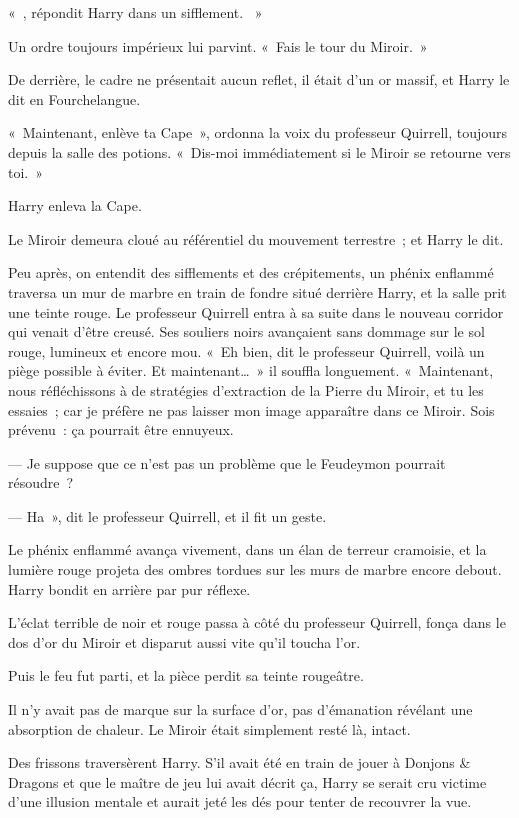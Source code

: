 «~, répondit Harry dans un sifflement. ~»

Un ordre toujours impérieux lui parvint. «~Fais le tour du Miroir.~»

De derrière, le cadre ne présentait aucun reflet, il était d'un or massif, et Harry le dit en Fourchelangue.

«~Maintenant, enlève ta Cape~», ordonna la voix du professeur Quirrell, toujours depuis la salle des potions. «~Dis-moi immédiatement si le Miroir se retourne vers toi.~»

Harry enleva la Cape.

Le Miroir demeura cloué au référentiel du mouvement terrestre~; et Harry le dit.

Peu après, on entendit des sifflements et des crépitements, un phénix enflammé traversa un mur de marbre en train de fondre situé derrière Harry, et la salle prit une teinte rouge. Le professeur Quirrell entra à sa suite dans le nouveau corridor qui venait d'être creusé. Ses souliers noirs avançaient sans dommage sur le sol rouge, lumineux et encore mou. «~Eh bien, dit le professeur Quirrell, voilà un piège possible à éviter. Et maintenant…~» il souffla longuement. «~Maintenant, nous réfléchissons à de stratégies d'extraction de la Pierre du Miroir, et tu les essaies~; car je préfère ne pas laisser mon image apparaître dans ce Miroir. Sois prévenu~: ça pourrait être ennuyeux.

--- Je suppose que ce n'est pas un problème que le Feudeymon pourrait résoudre~?

--- Ha~», dit le professeur Quirrell, et il fit un geste.

Le phénix enflammé avança vivement, dans un élan de terreur cramoisie, et la lumière rouge projeta des ombres tordues sur les murs de marbre encore debout. Harry bondit en arrière par pur réflexe.

L'éclat terrible de noir et rouge passa à côté du professeur Quirrell, fonça dans le dos d'or du Miroir et disparut aussi vite qu'il toucha l'or.

Puis le feu fut parti, et la pièce perdit sa teinte rougeâtre.

Il n'y avait pas de marque sur la surface d'or, pas d'émanation révélant une absorption de chaleur. Le Miroir était simplement resté là, intact.

Des frissons traversèrent Harry. S'il avait été en train de jouer à Donjons \& Dragons et que le maître de jeu lui avait décrit ça, Harry se serait cru victime d'une illusion mentale et aurait jeté les dés pour tenter de recouvrer la vue.


